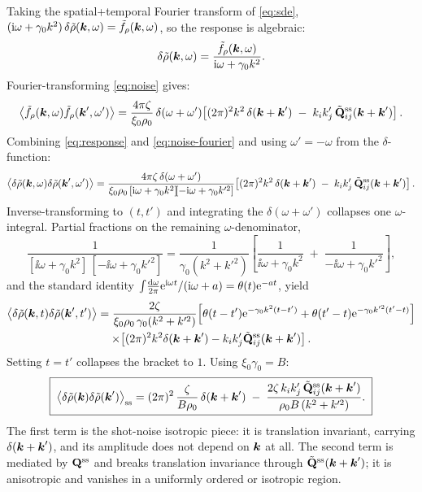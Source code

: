 \documentclass[a5paper]{article}
\begin{document}
Taking the spatial+temporal Fourier transform of \eqref{eq:sde}, $(\mathrm{i}\omega+\gamma_0 k^2)\,\delta\tilde\rho(\boldsymbol{k},\omega) = \tilde f_\rho(\boldsymbol{k},\omega)$, so the response is algebraic:
\begin{equation}
    \label{eq:response}
    \delta\tilde\rho(\boldsymbol{k},\omega) = \frac{\tilde f_\rho(\boldsymbol{k},\omega)}{\mathrm{i}\omega+\gamma_0 k^2}.
\end{equation}
Fourier-transforming \eqref{eq:noise} gives:
\begin{equation}
    \label{eq:noise-fourier}
    \left\langle\tilde f_\rho(\boldsymbol{k},\omega)\tilde f_\rho(\boldsymbol{k}',\omega')\right\rangle = \frac{4\pi\zeta}{\xi_0\rho_0}\,\delta(\omega+\omega')\!\left[(2\pi)^2 k^2\,\delta(\boldsymbol{k}+\boldsymbol{k}')\;-\;k_i k'_j\,\tilde{\mathbf{Q}}^{\mathrm{ss}}_{ij}(\boldsymbol{k}+\boldsymbol{k}')\right].
\end{equation}
Combining \eqref{eq:response} and \eqref{eq:noise-fourier} and using $\omega'=-\omega$ from the $\delta$-function:
\begin{equation}
    \label{eq:corr-omega}
    \left\langle\delta\tilde\rho(\boldsymbol{k},\omega)\delta\tilde\rho(\boldsymbol{k}',\omega')\right\rangle = \frac{4\pi\zeta\,\delta(\omega+\omega')}{\xi_0\rho_0\,[\mathrm{i}\omega+\gamma_0 k^2]\![-\mathrm{i}\omega+\gamma_0 k'^2]}\!\left[(2\pi)^2 k^2\,\delta(\boldsymbol{k}+\boldsymbol{k}')\;-\;k_i k'_j\,\tilde{\mathbf{Q}}^{\mathrm{ss}}_{ij}(\boldsymbol{k}+\boldsymbol{k}')\right].
\end{equation}
Inverse-transforming to $(t,t')$ and integrating the $\delta(\omega+\omega')$ collapses one $\omega$-integral. Partial fractions on the remaining $\omega$-denominator,
\begin{equation}
    \frac{1}{[\ii\omega+\gamma_0 k^2]\,[-\ii\omega+\gamma_0 k'^2]} = \frac{1}{\gamma_0(k^2+k'^2)}\!\left[\frac{1}{\ii\omega+\gamma_0 k^2}\;+\;\frac{1}{-\ii\omega+\gamma_0 k'^2}\right],
\end{equation}
and the standard identity $\int\!\frac{\mathrm{d}\omega}{2\pi}\mathrm{e}^{\mathrm{i}\omega t}/(\mathrm{i}\omega+a) = \theta(t)\mathrm{e}^{-at}$, yield
\begin{multline}
    \label{eq:iso-gauss-autocorr}
    \left\langle\delta\tilde\rho(\boldsymbol{k},t)\delta\tilde\rho(\boldsymbol{k}',t')\right\rangle = \frac{2\zeta}{\xi_0\rho_0\,\gamma_0(k^2+k'^2)}\!\left[\theta(t-t')\mathrm{e}^{-\gamma_0 k^2(t-t')}+\theta(t'-t)\mathrm{e}^{-\gamma_0 k'^2(t'-t)}\right]
    \\
    \times\!\left[(2\pi)^2 k^2\delta(\boldsymbol{k}+\boldsymbol{k}') - k_ik'_j\tilde{\mathbf{Q}}^{\mathrm{ss}}_{ij}(\boldsymbol{k}+\boldsymbol{k}')\right].
\end{multline}
Setting $t=t'$ collapses the bracket to $1$. Using $\xi_0\gamma_0 = B$:
\begin{equation}
    \label{eq:autocorr-fourier}
    \boxed{\;
    \left\langle\delta\tilde\rho(\boldsymbol{k})\delta\tilde\rho(\boldsymbol{k}')\right\rangle_{\mathrm{ss}} = (2\pi)^2\,\frac{\zeta}{B\rho_0}\,\delta(\boldsymbol{k}+\boldsymbol{k}')\;-\;\frac{2\zeta\,k_i k'_j\,\tilde{\mathbf{Q}}^{\mathrm{ss}}_{ij}(\boldsymbol{k}+\boldsymbol{k}')}{\rho_0 B\,(k^2+k'^2)}.
    \;}
\end{equation}
The first term is the shot-noise isotropic piece: it is translation invariant, carrying $\delta(\boldsymbol{k}+\boldsymbol{k}')$, and its amplitude does not depend on $\boldsymbol{k}$ at all. The second term is mediated by $\mathbf{Q}^{\mathrm{ss}}$ and breaks translation invariance through $\tilde{\mathbf{Q}}^{\mathrm{ss}}(\boldsymbol{k}+\boldsymbol{k}')$; it is anisotropic and vanishes in a uniformly ordered or isotropic region.
\end{document}
